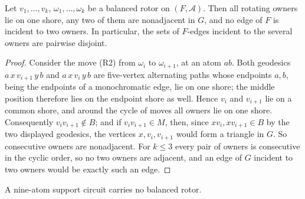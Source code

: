 \begin{lemma}\label{lem:t3-disjoint}
Let \(v_1,\dots,v_k\), \(\omega_1,\dots,\omega_k\) be a balanced rotor
on \((F,\mathcal A)\). Then all rotating owners lie on one shore, any
two of them are nonadjacent in \(G\), and no edge of \(F\) is incident
to two owners. In particular, the sets of \(F\)-edges incident to the
several owners are pairwise disjoint.
\end{lemma}

\begin{proof}
Consider the move (R2) from \(\omega_i\) to \(\omega_{i+1}\), at an
atom \(ab\). Both geodesics \(a\,x\,v_{i+1}\,y\,b\) and
\(a\,x\,v_i\,y\,b\) are five-vertex alternating paths whose endpoints
\(a,b\), being the endpoints of a monochromatic edge, lie on one shore;
the middle position therefore lies on the endpoint shore as well.
Hence \(v_i\) and \(v_{i+1}\) lie on a common shore, and around the
cycle of moves all owners lie on one shore. Consequently
\(v_iv_{i+1}\notin B\); and if \(v_iv_{i+1}\in M\), then, since
\(xv_i,xv_{i+1}\in B\) by the two displayed geodesics, the vertices
\(x,v_i,v_{i+1}\) would form a triangle in \(G\). So consecutive
owners are nonadjacent. For \(k\le3\) every pair of owners is
consecutive in the cyclic order, so no two owners are adjacent, and an
edge of \(G\) incident to two owners would be exactly such an edge.
\end{proof}

\begin{theorem}\label{thm:t3-counting}
A nine-atom support circuit carries no balanced rotor.
\end{theorem}

